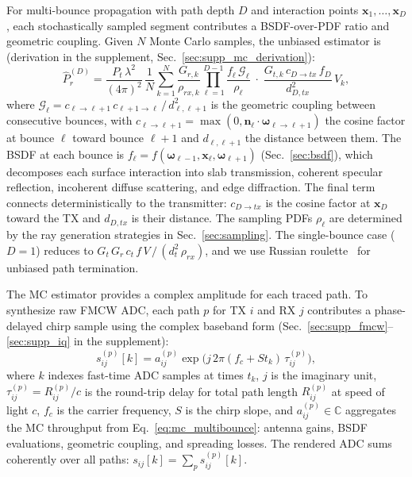 For multi-bounce propagation with path depth $D$ and interaction points $\mathbf{x}_1, \ldots, \mathbf{x}_D$, each stochastically sampled segment contributes a BSDF-over-PDF ratio and geometric coupling. Given $N$ Monte Carlo samples, the unbiased estimator is (derivation in the supplement, Sec.~\ref{sec:supp_mc_derivation}):
\begin{equation}
    \hat{P}_r^{(D)}
    =
    \frac{P_t\,\lambda^2}{(4\pi)^2}\,
    \frac{1}{N}\sum_{k=1}^{N}
    \frac{G_{r,k}}{\rho_{rx,k}}
    \prod_{\ell=1}^{D{-}1}
    \frac{f_\ell\, \mathcal{G}_\ell}{\rho_\ell}
    \;\cdot\;
    \frac{G_{t,k}\, c_{D{\to}tx}\, f_D}{d_{D,tx}^2}
    \, V_k,
    \label{eq:mc_multibounce}
\end{equation}
where $\mathcal{G}_\ell = c_{\ell{\to}\ell{+}1}\, c_{\ell{+}1{\to}\ell}\,/\,d_{\ell,\ell{+}1}^2$ is the geometric coupling between consecutive bounces, with $c_{\ell{\to}\ell{+}1} = \max(0, \mathbf{n}_\ell \cdot \boldsymbol{\omega}_{\ell{\to}\ell{+}1})$ the cosine factor at bounce $\ell$ toward bounce $\ell{+}1$ and $d_{\ell,\ell{+}1}$ the distance between them. The BSDF at each bounce is $f_\ell = f(\boldsymbol{\omega}_{\ell-1}, \mathbf{x}_\ell, \boldsymbol{\omega}_{\ell+1})$ (Sec.~\ref{sec:bsdf}), which decomposes each surface interaction into slab transmission, coherent specular reflection, incoherent diffuse scattering, and edge diffraction. The final term connects deterministically to the transmitter: $c_{D{\to}tx}$ is the cosine factor at $\mathbf{x}_D$ toward the TX and $d_{D,tx}$ is their distance. The sampling PDFs $\rho_\ell$ are determined by the ray generation strategies in Sec.~\ref{sec:sampling}. The single-bounce case ($D{=}1$) reduces to $G_t\,G_r\,c_t\,f\,V\,/\,(d_t^2\,\rho_{rx})$, and we use Russian roulette~\cite{veach1998robust} for unbiased path termination.

The MC estimator provides a complex amplitude for each traced path. To synthesize raw FMCW ADC, each path $p$ for TX $i$ and RX $j$ contributes a phase-delayed chirp sample using the complex baseband form (Sec.~\ref{sec:supp_fmcw}--\ref{sec:supp_iq} in the supplement):
\begin{equation}
    s_{ij}^{(p)}[k]
    =
    a_{ij}^{(p)}
    \exp\!\Big(j\, 2\pi (f_c + S t_k)\,\tau_{ij}^{(p)} \Big),
    \label{eq:path_adc}
\end{equation}
where $k$ indexes fast-time ADC samples at times $t_k$, $j$ is the imaginary unit, $\tau_{ij}^{(p)} = R_{ij}^{(p)}/c$ is the round-trip delay for total path length $R_{ij}^{(p)}$ at speed of light $c$, $f_c$ is the carrier frequency, $S$ is the chirp slope, and $a_{ij}^{(p)} \in \mathbb{C}$ aggregates the MC throughput from Eq.~\eqref{eq:mc_multibounce}: antenna gains, BSDF evaluations, geometric coupling, and spreading losses. The rendered ADC sums coherently over all paths: $s_{ij}[k] = \sum_p s_{ij}^{(p)}[k]$.

